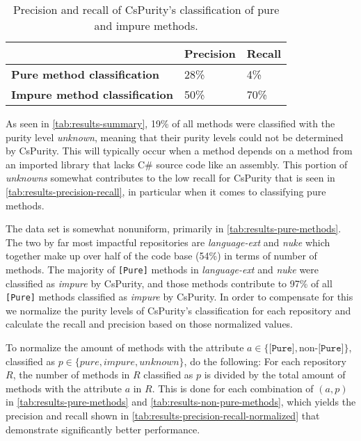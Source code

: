 \documentclass[a4paper,12pt]{article}
\begin{document}
\begin{table}[H]
  \centering
  \caption{Precision and recall of CsPurity's classification of pure and impure methods.}
  \label{tab:results-precision-recall}
  \begin{tabular}{|l|ll|}
    \hline
                                          & \textbf{Precision} & \textbf{Recall} \\
    \hline
    \textbf{Pure method classification}   & 28\%               & 4\%             \\
    \textbf{Impure method classification} & 50\%               & 70\%            \\
    \hline
  \end{tabular}
\end{table}

As seen in \autoref{tab:results-summary}, 19\% of all methods were classified with the purity level \textit{unknown}, meaning that their purity levels could not be determined by CsPurity. This will typically occur when a method depends on a method from an imported library that lacks C\# source code like an assembly. This portion of \textit{unknowns} somewhat contributes to the low recall for CsPurity that is seen in \autoref{tab:results-precision-recall}, in particular when it comes to classifying pure methods.

The data set is somewhat nonuniform, primarily in \autoref{tab:results-pure-methods}. The two by far most impactful repositories are \textit{language-ext} and \textit{nuke} which together make up over half of the code base (54\%) in terms of number of methods. The majority of \texttt{[Pure]} methods in \textit{language-ext} and \textit{nuke} were classified as \textit{impure} by CsPurity, and those methods contribute to 97\% of all \texttt{[Pure]} methods classified as \textit{impure} by CsPurity. In order to compensate for this we normalize the purity levels of CsPurity's classification for each repository and calculate the recall and precision based on those normalized values.

To normalize the amount of methods with the attribute $a \in \{\texttt{[Pure]}, \text{non-}\texttt{[Pure]}\}$, classified as $p \in \{pure, impure, unknown\}$, do the following: For each repository $R$, the number of methods in $R$ classified as $p$ is divided by the total amount of methods with the attribute $a$ in $R$. %
This is done for each combination of $(a, p)$ in \autoref{tab:results-pure-methods} and \autoref{tab:results-non-pure-methods}, which yields the precision and recall shown in \autoref{tab:results-precision-recall-normalized} that demonstrate significantly better performance.
\end{document}
